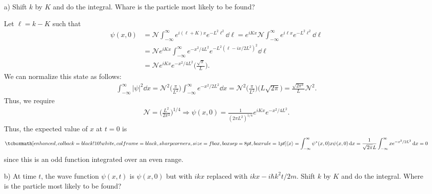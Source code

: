 a) Shift $k$ by $K$ and do the integral.
Whare is the particle most likely to be found?

Let $\ell = k - K$ such that 
\begin{align}
    \label{eq:wave-packet-shift}
    \psi(x,0) &= \mathcal{N} \int_{-\infty}^{\infty} e^{i(\ell + K)x} e^{-L^2\ell^2} \dd{\ell} = e^{iKx} \mathcal{N} \int_{-\infty}^{\infty} e^{i \ell x} e^{-L^2 \ell^2} \dd{\ell} \\
              &= \mathcal{N} e^{iKx} \int_{-\infty}^{\infty} e^{-x^2/4L^2} e^{-L^2(\ell - ix/2L^2)^2} \dd{\ell} \\
              &= \mathcal{N} e^{iKx} e^{-x^2/4L^2} \Big( \frac{\sqrt{\pi}}{L} \Big)
.\end{align}
We can normalize this state as follows:
\begin{eqnarray}
    \label{eq:normalize-state}
    \int_{-\infty}^{\infty} |\psi|^2 \dd{x} = \mathcal{N}^2 \Big( \frac{\pi}{L^2} \Big) \int_{-\infty}^{\infty} e^{-x^2/2L^2} \dd{x} = \mathcal{N}^2 \Big( \frac{\pi}{L^2} \Big) \Big( L\sqrt{2\pi} \Big) = \frac{\sqrt{2 \pi^3}}{L} \mathcal{N}^2
.\end{eqnarray}
Thus, we require
\begin{eqnarray}
    \label{eq:normalization-const}
    \mathcal{N} = \Big( \frac{L^2}{2\pi^3} \Big)^{1/4} \Rightarrow \psi(x,0) = \frac{1}{(2\pi L^2)^{1/4}} e^{iKx} e^{-x^2/4L^2}
.\end{eqnarray}
Thus, the expected value of $x$ at $t = 0$ is
\begin{eqnarray}
    \label{eq:expval-x-t0}
    \eqbox{
    \expval{x} = \int_{-\infty}^{\infty} \psi^{*}(x,0) x \psi(x,0) \dd{x} = \frac{1}{\sqrt{2\pi}L} \int_{-\infty}^{\infty} x e^{-x^2/2L^2} \dd{x} = 0
}
\end{eqnarray}
since this is an odd function integrated over an even range.


b) At time $t$, the wave function $\psi(x,t)$ is $\psi(x,0)$ but with $ikx$ replaced with $ikx - i\hbar k^2t/2m$.
Shift $k$ by $K$ and do the integral.
Where is the particle most likely to be found?

